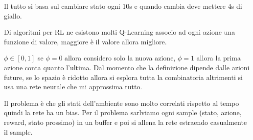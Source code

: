 Il tutto si basa sul cambiare stato ogni 10s e quando cambia deve mettere 4s di 
giallo.

Di algoritmi per RL ne esistono molti Q-Learning associo ad ogni azione 
una funzione di valore, maggiore è il valore allora migliore.

$\phi \in [0,1]$ se $\phi=0$ allora considero solo la nuova azione, $\phi=1$ 
allora la prima azione conta quanto l'ultima. Dal momento che la definizione dipende 
dalle azioni future, se lo spazio è ridotto allora si esplora tutta la combinatoria 
altrimenti si usa una rete neurale che mi approssima tutto.

Il problema è che gli stati dell'ambiente sono molto correlati rispetto al tempo 
quindi la rete ha un bias. Per il problema sarlviamo ogni sample (stato, azione, 
reward, stato prossimo) in un buffer e poi si allena la rete estraendo casualmente 
il sample.